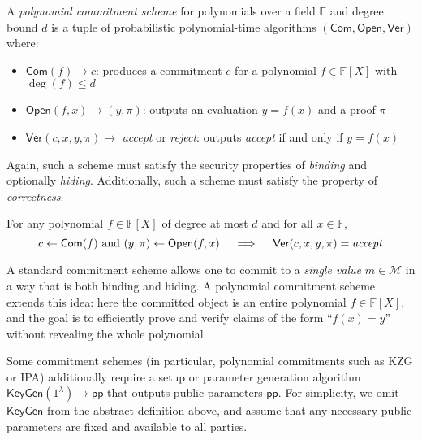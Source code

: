 \begin{definition}
A \emph{polynomial commitment scheme} for polynomials over a field $\mathbb{F}$ and degree bound $d$ is a tuple of probabilistic polynomial-time algorithms
$
(\mathsf{Com}, \mathsf{Open}, \mathsf{Ver})
$
where:

\begin{itemize}
    \item $\mathsf{Com}(f) \to c$:  
   produces a commitment $c$ for a polynomial $f \in \mathbb{F}[X]$ with $\deg(f) \le d$
    
    \item $\mathsf{Open}(f, x) \to (y, \pi)$:  
    outputs an evaluation $y = f(x)$ and a proof $\pi$
    
    \item $\mathsf{Ver}(c, x, y, \pi) \to$ \emph{accept} or \emph{reject}:  
    outputs \emph{accept} if and only if $y = f(x)$
\end{itemize}

\noindent Again, such a scheme must satisfy the security properties of \emph{binding} and optionally \emph{hiding}. Additionally, such a scheme must satisfy the property of \emph{correctness}.
\end{definition}

\begin{definition}[Correctness]
For any polynomial $f \in \mathbb{F}[X]$ of degree at most $d$ and for all $x \in \mathbb{F}$,
$$
c \leftarrow \mathsf{Com}(f) \text{ and } (y, \pi) \leftarrow \mathsf{Open}(f, x) \quad \implies \quad  \mathsf{Ver}(c, x, y, \pi) = \text{\emph{accept}}
$$
\end{definition}

\begin{remark}
A standard commitment scheme allows one to commit to a \emph{single value} $m \in \mathcal{M}$ in a way that is both binding and hiding. 
A polynomial commitment scheme extends this idea: here the committed object is an entire polynomial $f \in \mathbb{F}[X]$, and the goal is to efficiently prove and verify claims of the form ``$f(x) = y$'' without revealing the whole polynomial.
\end{remark}

\begin{remark}
Some commitment schemes (in particular, polynomial commitments such as KZG or IPA) additionally require a setup or parameter generation algorithm 
$\mathsf{KeyGen}(1^\lambda) \to \mathsf{pp}$ 
that outputs public parameters $\mathsf{pp}$.  
For simplicity, we omit $\mathsf{KeyGen}$ from the abstract definition above, and assume that any necessary public parameters are fixed and available to all parties.
\end{remark}




